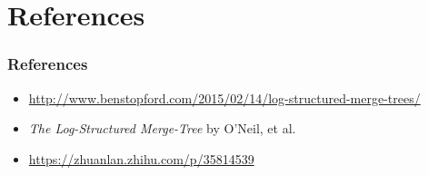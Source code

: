 \documentclass[lualatex]{beamer}
\begin{document}
\section*{References}
\frame{\tableofcontents}

\begin{frame}
  \frametitle{References}
  \begin{itemize}
    \item \url{http://www.benstopford.com/2015/02/14/log-structured-merge-trees/}
    \item \textsl{The Log-Structured Merge-Tree} by O'Neil, et al.
    \item \url{https://zhuanlan.zhihu.com/p/35814539}
  \end{itemize}
\end{frame}
\end{document}
